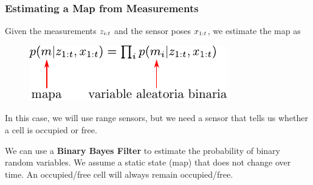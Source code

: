     \begin{frame}
    \frametitle{Estimating a Map from Measurements}
    
    Given the measurements $z_{i:t}$ and the sensor poses $x_{1:t}$, we estimate the map as
    
    \begin{figure}[!h]
    \includegraphics[width=0.5\columnwidth]{./images/map_from_sensor_data.pdf}
    \end{figure}
    
    In this case, we will use range sensors, but we need a sensor that tells us whether a cell is occupied or free.
    
    We can use a {\bf Binary Bayes Filter} to estimate the probability of binary random variables. We assume a static state (map) that does not change over time. An occupied/free cell will always remain occupied/free.
    
\end{frame}

